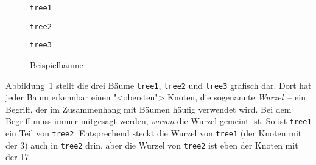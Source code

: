 \begin{figure}[tb]
  \centering
  \begin{minipage}{0.3\textwidth}
\begin{center}
  \lstinline{tree1}\\[1ex]
\end{center}
\end{minipage}
\begin{minipage}{0.3\textwidth}
\begin{center}
  \lstinline{tree2}\\[1ex]
\end{center}
\end{minipage}
\begin{minipage}{0.3\textwidth}
\begin{center}
  \lstinline{tree3}\\[1ex]
\end{center}
\end{minipage}
\caption{Beispielbäume}
  \label{fig:tree123}
\end{figure}

Abbildung~\ref{fig:tree123} stellt die drei Bäume \lstinline{tree1},
\lstinline{tree2} und \lstinline{tree3} grafisch dar.  Dort hat jeder
Baum erkennbar einen "<obersten"> Knoten, die sogenannte
\textit{Wurzel}~-- ein Begriff, der im Zusammenhang mit
Bäumen häufig verwendet wird.  Bei dem Begriff muss immer mitgesagt
werden, \emph{wovon} die Wurzel gemeint ist. So ist 
\lstinline{tree1} ein Teil von \lstinline{tree2}.  Entsprechend steckt
die Wurzel von \lstinline{tree1} (der Knoten mit der 3) auch in
\lstinline{tree2} drin, aber die Wurzel von \lstinline{tree2} ist eben
der Knoten mit der 17.

